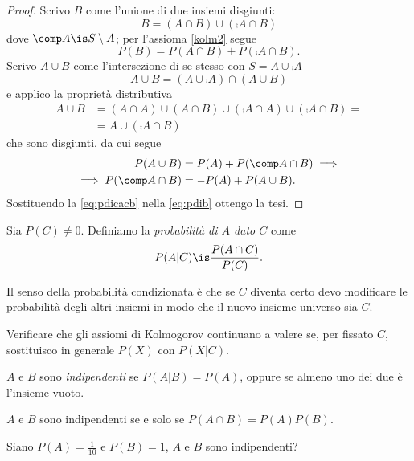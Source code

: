 \begin{proof}
	Scrivo $B$ come l'unione di due insiemi disgiunti:
	\[B = (A\cap B) \cup (\comp A \cap B)\]
	dove $\comp A\is S\setminus A$; per l'assioma \ref{kolm2} segue
	\begin{equation}
		\label{eq:pdib}
		P(B) = P(A\cap B) + P(\comp A \cap B).
	\end{equation}
	Scrivo $A\cup B$ come l'intersezione di se stesso con $S=A\cup\comp A$
	\[A\cup B = (A\cup\comp A) \cap (A\cup B)\]
	e applico la proprietà distributiva
	\begin{align*}
		A\cup B
		&= (A\cap A) \cup (A\cap B) \cup (\comp A\cap A) \cup (\comp A \cap B) = \\
		&= A \cup (\comp A\cap B)
	\end{align*}
	che sono disgiunti, da cui segue
	\begin{align}
		P(A\cup B)
		&= P(A) + P(\comp A\cap B) \implies \notag \\
		\implies P(\comp A\cap B)
		&= -P(A) + P(A\cup B). \label{eq:pdicacb}
	\end{align}
	Sostituendo la \eqref{eq:pdicacb} nella \eqref{eq:pdib} ottengo la tesi.
\end{proof}

\begin{definition}
	Sia $P(C)\neq 0$. Definiamo la \emph{probabilità di $A$ dato $C$} come
	\[P(A|C) \is \frac{P(A\cap C)}{P(C)}.\]
\end{definition}

\noindent Il senso della probabilità condizionata è che se $C$ diventa certo
devo modificare le probabilità degli altri insiemi in modo che il nuovo insieme universo sia $C$.

\begin{exercise}
	Verificare che gli assiomi di Kolmogorov continuano a valere se, per fissato $C$, sostituisco in generale $P(X)$ con $P(X|C)$.
\end{exercise}

\begin{definition}[Indipendenza]
	$A$ e $B$ sono \emph{indipendenti} se $P(A|B) = P(A)$,
	oppure se almeno uno dei due è l'insieme vuoto.
\end{definition}

\begin{exercise}
	$A$ e $B$ sono indipendenti se e solo se $P(A\cap B) = P(A)P(B)$.
\end{exercise}

\begin{exercise}
	Siano $P(A)=\frac1{10}$ e $P(B)=1$, $A$ e $B$ sono indipendenti?
\end{exercise}

